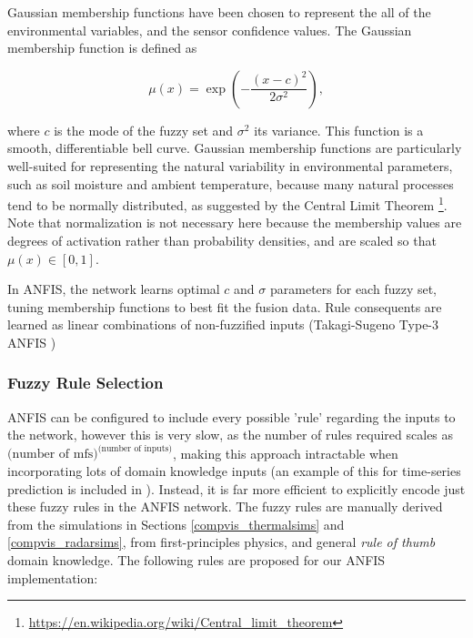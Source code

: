         Gaussian membership functions have been chosen to represent the all of the environmental variables, and the sensor confidence values. The Gaussian membership function is defined as
        
        \[
        \mu(x) = \exp\left( -\frac{(x - c)^2}{2\sigma^2} \right),
        \]
        
        where \( c \) is the mode of the fuzzy set and \( \sigma^2 \) its variance. This function is a smooth, differentiable bell curve.
        Gaussian membership functions are particularly well-suited for representing the natural variability in environmental parameters, such as soil moisture and ambient temperature, because many natural processes tend to be normally distributed, as suggested by the Central Limit Theorem \footnote{\url{https://en.wikipedia.org/wiki/Central_limit_theorem}}. Note that normalization is not necessary here because the membership values are degrees of activation rather than probability densities, and are scaled so that \(\mu(x)\in [0,1]\).
        
        In ANFIS, the network learns optimal \(c\) and \(\sigma\) parameters for each fuzzy set, tuning membership functions to best fit the fusion data. Rule consequents are learned as linear combinations of non-fuzzified inputs (Takagi-Sugeno Type-3 ANFIS \cite{jang1993anfis})
        
    \subsubsection{Fuzzy Rule Selection}
    
        ANFIS can be configured to include every possible 'rule' regarding the inputs to the network, however this is very slow, as the number of rules required scales as \(\text{(number of mfs)}^\text{(number of inputs)}\), making this approach intractable when incorporating lots of domain knowledge inputs (an example of this for time-series prediction is included in \cite{jang1993anfis}). Instead, it is far more efficient to explicitly encode just these fuzzy rules in the ANFIS network. The fuzzy rules are manually derived from the simulations in Sections \ref{compvis_thermalsims} and \ref{compvis_radarsims}, from first-principles physics, and general \textit{rule of thumb} domain knowledge. The following rules are proposed for our ANFIS implementation:
        

